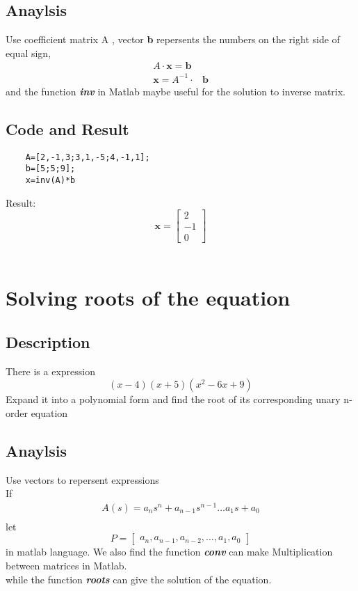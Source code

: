 \documentclass[UTF8,a4paper]{article}
\begin{document}
\subsection{Anaylsis}
Use coefficient matrix A , vector \textbf{b} repersents the numbers on the right side of equal sign,
$$
\begin{aligned}
     A\cdot \textbf{x}=\textbf{b}&\\
     \textbf{x}=A^{-1}\cdot & \textbf{b}
\end{aligned}
$$
and the function \textbf{\textit{inv}} in Matlab maybe useful for the solution to inverse matrix.
\subsection{Code and Result}
\begin{lstlisting}
    A=[2,-1,3;3,1,-5;4,-1,1];
    b=[5;5;9];
    x=inv(A)*b
\end{lstlisting}
Result:\\
\[\textbf{x}=\begin{bmatrix}
    2\\
    -1\\
    0
\end{bmatrix}\]
\\
\section{Solving roots of the equation}
\subsection{Description}
There is a expression
$$
(x-4)(x+5)(x^2-6x+9)
$$
Expand it into a polynomial form and find the root of 
its corresponding unary n-order equation
\subsection{Anaylsis}
Use vectors to repersent expressions\\
If
$$
\begin{aligned}
A(s)=a_{n}s^{n}+a_{n-1}s^{n-1} \dots a_1 s+a_0\\
\end{aligned}
$$
let
\[P=\begin{bmatrix}
    a_n,a_{n-1},a_{n-2},\dots,a_1,a_0  
\end{bmatrix} \] in matlab language.
We also find the function \textbf{\textit{conv}} can make Multiplication between matrices in Matlab.\\
\indent while the function \textbf{\textit{roots}} can give the solution of the equation.
\end{document}

